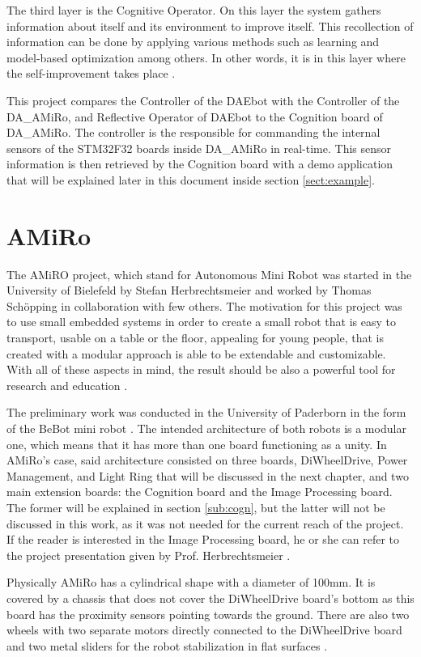 \documentclass[12pt]{report}%
\begin{document}
The third layer is the Cognitive Operator. On this layer the system gathers information about itself and its environment to improve itself. This recollection of information can be done by applying various methods such as learning and model-based optimization among others. In other words, it is in this layer where the self-improvement takes place \cite{ocmAuto}.

This project compares the Controller of the DAEbot with the Controller of the DA\_AMiRo, and Reflective Operator of DAEbot to the Cognition board of DA\_AMiRo. The controller is the responsible for commanding the internal sensors of the STM32F32 boards inside DA\_AMiRo in real-time. This sensor information is then retrieved by the Cognition board with a demo application that will be explained later in this document inside section \ref{sect:example}.

\section{AMiRo}
The AMiRO project, which stand for Autonomous Mini Robot was started in the University of Bielefeld by Stefan Herbrechtsmeier and worked by Thomas Schöpping in collaboration with few others. The motivation for this project was to use small embedded systems in order to create a small robot that is easy to transport, usable on a table or the floor, appealing for young people, that is created with a modular approach is able to be extendable and customizable. With all of these aspects in mind, the result should be also a powerful tool for research and education \cite{AMiRo_ppt_v1}.

The preliminary work was conducted in the University of Paderborn in the form of the BeBot mini robot \cite{AMiRo_ppt_v1}. The intended architecture of both robots is a modular one, which means that it has more than one board functioning as a unity. In AMiRo's case, said architecture consisted on three boards, DiWheelDrive, Power Management, and Light Ring that will be discussed in the next chapter, and two main extension boards: the Cognition board and the Image Processing board. The former will be explained in section \ref{sub:cogn}, but the latter will not be discussed in this work, as it was not needed for the current reach of the project. If the reader is interested in the Image Processing board, he or she can refer to the project presentation given by Prof. Herbrechtsmeier \cite{AMiRo_ppt_v2}.

Physically AMiRo has a cylindrical shape with a diameter of 100mm. It is covered by a chassis that does not cover the DiWheelDrive board's bottom as this board has the proximity sensors pointing towards the ground. There are also two wheels with two separate motors directly connected to the DiWheelDrive board and two metal sliders for the robot stabilization in flat surfaces \cite{AMiRo_paper_modular}.
\end{document}

